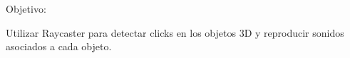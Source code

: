 Objetivo: 

Utilizar Raycaster para detectar clicks en los objetos 3D y reproducir sonidos asociados a cada objeto.

